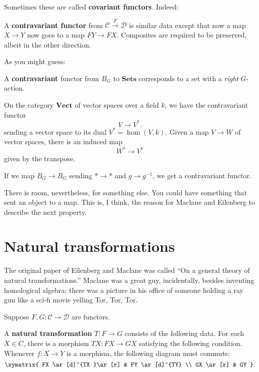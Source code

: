 Sometimes these are called \textbf{covariant functors}. Indeed:

\begin{definition} 
A \textbf{contravariant functor} from $\mathcal{C} \stackrel{F}{\to}\mathcal{D}$ is similar
data except that now a map $X \to Y$ now goes to a map $FY \to FX$. Composites
are required to be preserved, albeit in the other direction. 
\end{definition} 

As you might guess:

\begin{example} 
A \textbf{contravariant} functor from $B_G$ to $\mathbf{Sets}$ corresponds to a
set with a \emph{right} $G$-action. 
\end{example} 

\begin{example} 
On the category $\mathbf{Vect}$ of vector spaces over a field $k$, we have the contravariant
functor
\[ V \to V^{\ast}.  \]
sending a vector space to its dual $V^{\ast} = \hom(V,k)$. 
Given a map $V \to W$ of vector spaces, there is an induced map
\[ W^{\ast} \to V^{\ast}  \]
given by the transpose.
\end{example} 

\begin{example} 
If we map $B_G \to B_G$ sending $\ast \to \ast$ and $g \to g^{-1}$, we get a
contravariant functor. 
\end{example} 

There is room, nevertheless, for something else. You could have something that
sent an object to a map. 
This is, I think, the reason for Maclane and Eilenberg to describe the next
property.

\section{Natural transformations}

The original paper of Eilenberg and Maclane was called ``On a general theory of
natural transformations.'' Maclane was a great guy, incidentally, besides
inventing homological algebra; there was a
picture in his office of someone holding a ray gun like a sci-fi movie yelling Tor, Tor, Tor. 


Suppose $F, G: \mathcal{C} \to \mathcal{D}$ are functors.

\begin{definition} 
A \textbf{natural transformation} $T: F \to G$ consists of the following data.
For each $X \in C$, there is a morphism $TX: FX \to GX$ satisfying the following
condition. Whenever $f: X \to Y$ is a morphism, the following diagram must
commute:
\[ \xymatrix{
FX \ar[d]^{TX }\ar[r] &  FY \ar[d]^{TY}  \\
GX \ar[r] &  GY
}.\]
\end{definition} 

